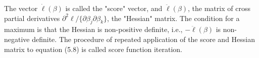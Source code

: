 The vector \(\dot{\ell}(\beta)\) is called the "score" vector, and \(\ddot{\ell}(\beta)\), the matrix of cross partial derivatives 
\(\partial^2 \ell/\{\partial \beta_j \partial \beta_k\}\), the "Hessian" matrix. 
The condition for a maximum is that the Hessian is non-positive definite, i.e., \(-\ddot{\ell}(\beta)\) is non-negative definite. 
The procedure of repeated application of the score and Hessian matrix to equation (5.8) is called score function iteration.
